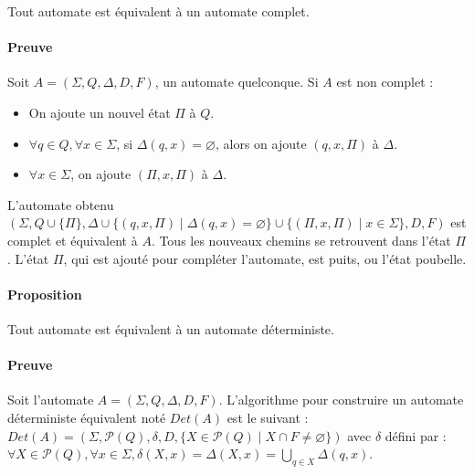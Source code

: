 Tout automate est équivalent à un automate complet.



\paragraph{Preuve} %
\label{par:preuve}

Soit $A=(\Sigma,Q,\Delta,D,F)$, un automate quelconque. Si $A$ est non complet :

\begin{itemize}
	\item On ajoute un nouvel état $\Pi$ à $Q$.
	\item $\forall q \in Q, \forall x \in \Sigma$, si $\Delta(q,x)=\varnothing$, alors on ajoute $(q,x,\Pi)$ à $\Delta$.
	\item $\forall x \in \Sigma$, on ajoute $(\Pi,x,\Pi)$ à $\Delta$.
\end{itemize}

L'automate obtenu $(\Sigma , Q \cup \{\Pi\} , \Delta \cup \{ (q,x,\Pi) \mid \Delta(q,x) = \varnothing \} \cup \{ (\Pi,x,\Pi) \mid x \in \Sigma \} , D , F)$ est complet et équivalent à $A$. Tous les nouveaux chemins se retrouvent dans l'état $\Pi$. L'état $\Pi$, qui est ajouté pour compléter l'automate, est puits, ou l'état poubelle.



\paragraph{Proposition} %
\label{par:proposition}

Tout automate est équivalent à un automate déterministe.



\paragraph{Preuve} %
\label{par:preuve}

Soit l'automate $A=(\Sigma,Q,\Delta,D,F)$. L'algorithme pour construire un automate déterministe équivalent noté $Det(A)$ est le suivant : \\
$Det(A) = (\Sigma , \mathcal{P}(Q) , \delta , D , \{X \in \mathcal{P}(Q) \mid X \cap F \not = \varnothing\} )$ avec $\delta$ défini par : $\forall X \in \mathcal{P}(Q), \forall x \in \Sigma, \delta(X,x)=\Delta(X,x)=\bigcup\limits_{q \in X} \Delta(q,x)$.

